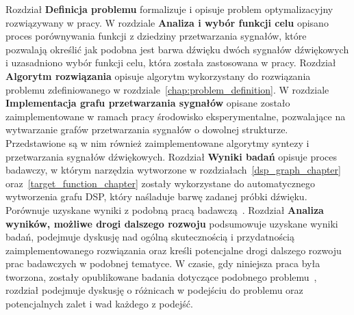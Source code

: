 Rozdział \textbf{Definicja problemu} formalizuje i opisuje problem optymalizacyjny rozwiązywany w pracy.
W rozdziale \textbf{Analiza i wybór funkcji celu} opisano proces porównywania funkcji z dziedziny przetwarzania sygnałów,
które pozwalają określić jak podobna jest barwa dźwięku dwóch sygnałów dźwiękowych i
uzasadniono wybór funkcji celu, która została zastosowana w pracy.
Rozdział \textbf{Algorytm rozwiązania} opisuje algorytm wykorzystany do rozwiązania problemu
zdefiniowanego w rozdziale~\ref{chap:problem_definition}.
W rozdziale \textbf{Implementacja grafu przetwarzania sygnałów} opisane zostało zaimplementowane w ramach pracy środowisko eksperymentalne,
pozwalające na wytwarzanie grafów przetwarzania sygnałów o dowolnej strukturze.
Przedstawione są w nim również zaimplementowane algorytmy syntezy i przetwarzania sygnałów dźwiękowych.
Rozdział \textbf{Wyniki badań} opisuje proces badawczy, w którym narzędzia wytworzone w
rozdziałach~\ref{dsp_graph_chapter} oraz~\ref{target_function_chapter}
zostały wykorzystane do automatycznego wytworzenia grafu DSP, który naśladuje barwę zadanej próbki dźwięku.
Porównuje uzyskane wyniki z podobną pracą badawczą~\cite{evolutionary_puredata}.
Rozdział \textbf{Analiza wyników, możliwe drogi dalszego rozwoju} podsumowuje uzyskane wyniki badań, podejmuje dyskusję nad ogólną skutecznością i przydatnością zaimplementowanego rozwiązania oraz
kreśli potencjalne drogi dalszego rozwoju prac badawczych w podobnej tematyce. W czasie, gdy niniejsza praca była tworzona, zostały opublikowane badania
dotyczące podobnego problemu~\cite{ieee_synth_programming}, rozdział podejmuje dyskusję o różnicach w podejściu do problemu oraz potencjalnych
zalet i wad każdego z podejść.

